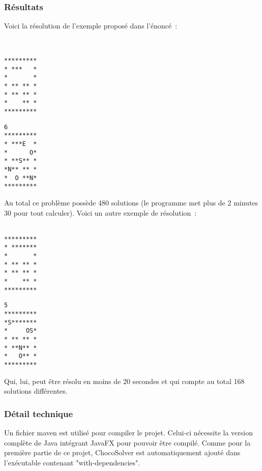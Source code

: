 \documentclass[a4paper,11pt]{article}
\begin{document}
        \subsubsection{Résultats}
        	Voici la résolution de l'exemple proposé dans l'énoncé~:\\\\
        	\begin{minipage}{.4\linewidth}
              \centering
              \begin{verbatim}

*********
* ***   *
*       *
* ** ** *
* ** ** *
*    ** *
*********
              \end{verbatim}
            \end{minipage}
            \begin{minipage}{.4\linewidth}
              \centering
              \begin{verbatim}
6
*********
* ***E  *
*      O*
* **S** *
*N** ** *
*  O **N*
*********
              \end{verbatim}
            \end{minipage}
             
            Au total ce problème possède 480 solutions (le programme met plus de 2 minutes 30 pour tout calculer).  Voici un autre exemple de résolution~:\\\\
            \begin{minipage}{.4\linewidth}
              \centering
              \begin{verbatim}
*********
* *******
*       *
* ** ** *
* ** ** *
*    ** *
*********
              \end{verbatim}
            \end{minipage}
            \begin{minipage}{.4\linewidth}
              \centering
              \begin{verbatim}
5
*********
*S*******
*     OS*
* ** ** *
* **N** *
*   O** *
*********
              \end{verbatim}
            \end{minipage}
            
           Qui, lui, peut être résolu en moins de 20 secondes et qui compte au total  168 solutions différentes.
	
    \subsubsection{Détail technique}
    	Un fichier maven est utilisé pour compiler le projet.  Celui-ci nécessite la version complète de Java intégrant JavaFX pour pouvoir être compilé.  Comme pour la première partie de ce projet, ChocoSolver est automatiquement ajouté dans l'exécutable contenant "with-dependencies".
    
\end{document}
